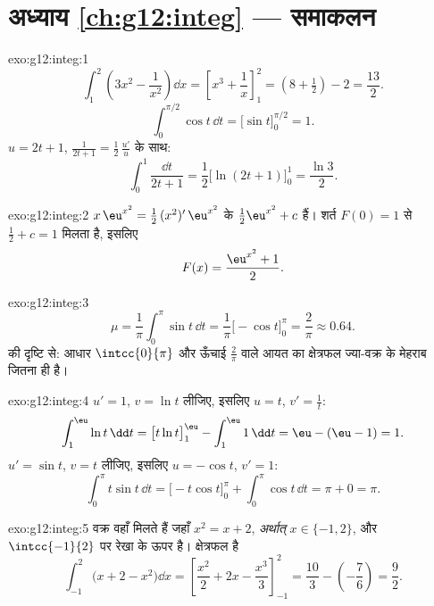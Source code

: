 \section*{अध्याय \ref{ch:g12:integ} --- समाकलन}

\begin{solution}{exo:g12:integ:1}
\[
\int_1^2 \left(3x^2 - \frac{1}{x^2}\right)\dd x
= \left[x^3 + \frac1x\right]_1^2 = \left(8 + \tfrac12\right) - 2 = \frac{13}{2}.
\]
\[
\int_0^{\pi/2} \cos t\,\dd t = \bigl[\sin t\bigr]_0^{\pi/2} = 1 .
\]
$u = 2t+1$, $\frac{1}{2t+1} = \frac12\,\frac{u'}{u}$ के साथ:
\[
\int_0^1 \frac{\dd t}{2t+1} = \frac12\bigl[\ln(2t+1)\bigr]_0^1
= \frac{\ln 3}{2}.
\]
\end{solution}

\begin{solution}{exo:g12:integ:2}
$x\,\eu^{x^2} = \frac12\,(x^2)'\,\eu^{x^2}$ के  $\frac12\eu^{x^2} + c$ हैं। शर्त $F(0) = 1$ से $\frac12 + c = 1$ मिलता है, इसलिए
\[
F(x) = \frac{\eu^{x^2} + 1}{2}.
\]
\end{solution}

\begin{solution}{exo:g12:integ:3}
\[
\mu = \frac{1}{\pi}\int_0^\pi \sin t\,\dd t
= \frac{1}{\pi}\bigl[-\cos t\bigr]_0^\pi = \frac{2}{\pi} \approx 0.64 .
\]
 की दृष्टि से: आधार $\intcc{0}{\pi}$ और ऊँचाई $\frac{2}{\pi}$ वाले आयत का क्षेत्रफल ज्या-वक्र के
मेहराब जितना ही है।
\end{solution}

\begin{solution}{exo:g12:integ:4}
$u' = 1$, $v = \ln t$ लीजिए, इसलिए $u = t$, $v' = \frac1t$:
\[
\int_1^{\eu} \ln t\,\dd t = \bigl[t\ln t\bigr]_1^{\eu} - \int_1^{\eu} 1\,\dd t
= \eu - (\eu - 1) = 1 .
\]
$u' = \sin t$, $v = t$ लीजिए, इसलिए $u = -\cos t$, $v' = 1$:
\[
\int_0^\pi t\sin t\,\dd t = \bigl[-t\cos t\bigr]_0^\pi + \int_0^\pi \cos t\,\dd t
= \pi + 0 = \pi .
\]
\end{solution}

\begin{solution}{exo:g12:integ:5}
वक्र वहाँ मिलते हैं जहाँ $x^2 = x + 2$, \emph{अर्थात्} $x \in \{-1, 2\}$, और $\intcc{-1}{2}$ पर रेखा  के
ऊपर है। क्षेत्रफल है
\[
\int_{-1}^{2} \bigl(x + 2 - x^2\bigr)\dd x
= \left[\frac{x^2}{2} + 2x - \frac{x^3}{3}\right]_{-1}^{2}
= \frac{10}{3} - \left(-\frac{7}{6}\right) = \frac{9}{2}.
\]
\end{solution}

